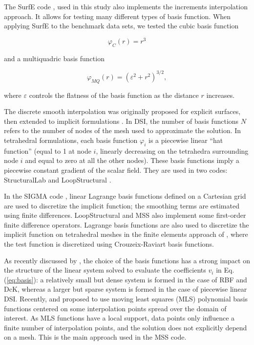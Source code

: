 \documentclass[preprint]{ring20}
\begin{document}
The SurfE code \citep{Hillier2014MG}, used in this study also implements the increments interpolation approach. It allows for testing many different types of basis function. When applying SurfE to the benchmark data sets, we tested the cubic basis function 

\begin{equation}
\varphi_{C}(r) = r^3
\end{equation}

\noindent and a multiquadric basis function

\begin{equation}
\varphi_{MQ}(r) = (\varepsilon^2 + r^2)^{3/2},
\end{equation}

\noindent where $\varepsilon$ controls the flatness of the basis function as the distance $r$ increases. 

The discrete smooth interpolation \citep[DSI, ][]{Mallet1992CD} was originally proposed for explicit surfaces, then extended to implicit formulations \citep{Frank2007CG,Caumon2013GaRSITo,Souche20137ECEISE2,Laurent2016MG,Irakarama2021MG}. In DSI, the number of basis functions $N$ refers to the number of nodes of the mesh used to approximate the solution. In tetrahedral formulations, each basis function $\varphi_i$ is a piecewise linear ``hat function'' (equal to 1 at node $i$, linearly decreasing on the tetrahedra surrounding node $i$ and equal to zero at all the other nodes). These basis functions imply a piecewise constant gradient of the scalar field. They are used in two codes: StructuralLab \citep{Frank2007CG,Caumon2013GaRSITo} and LoopStructural \citep{Grose2021GMDa}. 

In the SIGMA code \cite{Irakarama2021MG}, linear Lagrange basis functions defined on a Cartesian grid are used to discretize the implicit function; the smoothing terms are estimated using finite differences. LoopStructural and MSS also implement some first-order finite difference operators. 
Lagrange basis functions are also used to discretize the implicit function on tetrahedral meshes in the finite elements approach of \citet{Irakarama2022CD}, where
the test function is discretized using Crouzeix-Raviart basis functions. 

As recently discussed by \citet{Renaudeau2019MG}, the choice of the basis functions has a strong impact on the structure of the linear system solved to evaluate the coefficients $v_i$ in Eq. (\ref{eq:basis}): a relatively small but dense system is formed in the case of RBF and DcK, whereas a larger but sparse system is formed in the case of piecewise linear DSI. Recently, \citet{Renaudeau2019MG} and \citet{Manchuk2019CG} proposed to use moving least squares (MLS) polynomial basis functions centered on some interpolation points spread over the domain of interest. As MLS functions have a local support, data points only influence a finite number of interpolation points, and the solution does not explicitly depend on a mesh. This is the main approach used in the MSS code. 
\end{document}
